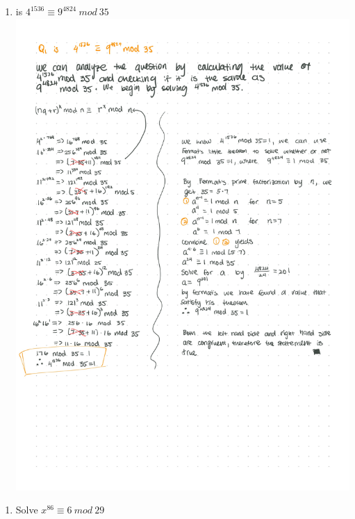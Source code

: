 \documentclass{article}
\begin{document}
    \begin{enumerate}[label=\textbf(Q1)]
        \item is $4^{1536} \equiv 9^{4824}\ mod\ 35$\\
        \includegraphics[scale=0.20, trim={0 20cm 0 0}, clip]{q1.jpg}
    \end{enumerate}
    \pagebreak
    \begin{enumerate}[label=\textbf{Q2}]
        \item Solve $x^{86} \equiv 6\ mod\ 29$
    \end{enumerate}
    \pagebreak
\end{document}
